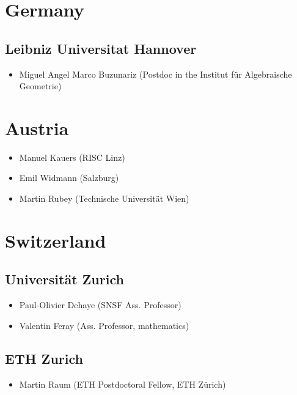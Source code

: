 \newcommand{\CS}{computer science}
\newcommand{\MATH}{mathematics}

\section*{Germany}

\subsection*{Leibniz Universitat Hannover}
\begin{itemize}
\item Miguel Angel Marco Buzunariz (Postdoc in the Institut für Algebraische Geometrie)
\end{itemize}

\section*{Austria}

\begin{itemize}
\item Manuel Kauers (RISC Linz)
\item Emil Widmann (Salzburg)
\item Martin Rubey (Technische Universität Wien)
\end{itemize}

\section{Switzerland}
\subsection*{Universität Zurich}
\begin{itemize}
\item Paul-Olivier Dehaye (SNSF Ass. Professor)
\item Valentin Feray (Ass. Professor, \MATH)
\end{itemize}
\subsection*{ETH Zurich}
\begin{itemize}
\item Martin Raum (ETH Postdoctoral Fellow, ETH Zürich)
\end{itemize}


